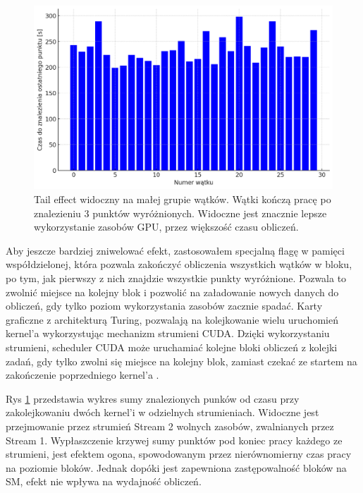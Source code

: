 \begin{figure}[H]
    \centering
    \includegraphics[width=1\textwidth]{img/tailing_effect_3_17.png}
    \caption{Tail effect widoczny na małej grupie wątków. Wątki kończą pracę po znalezieniu 3 punktów wyróżnionych.
        Widoczne jest znacznie lepsze wykorzystanie zasobów GPU, przez większość czasu obliczeń.}
    \label{fig:tail_effect_3}
\end{figure}

\par
Aby jeszcze bardziej zniwelować efekt, zastosowałem specjalną flagę w pamięci współdzielonej, która pozwala zakończyć obliczenia wszystkich wątków w bloku,
po tym, jak pierwszy z nich znajdzie wszystkie punkty wyróżnione. Pozwala to zwolnić miejsce na kolejny blok
i pozwolić na załadowanie nowych danych do obliczeń, gdy tylko poziom wykorzystania zasobów zacznie spadać.
Karty graficzne z architekturą Turing,
pozwalają na kolejkowanie wielu uruchomień kernel'a wykorzystując mechanizm strumieni CUDA.
Dzięki wykorzystaniu strumieni, scheduler CUDA
może uruchamiać kolejne bloki obliczeń z kolejki zadań, gdy tylko
zwolni się miejsce na kolejny blok, zamiast czekać ze startem na zakończenie poprzedniego kernel'a \cite{cuda}.
\par
Rys \ref{fig:tail_effect_3} przedstawia wykres sumy znalezionych punków od czasu przy zakolejkowaniu dwóch kernel'i w odzielnych strumieniach.
Widoczne jest przejmowanie przez strumień Stream 2 wolnych zasobów, zwalnianych przez Stream 1.
Wypłaszczenie krzywej sumy punktów pod koniec pracy każdego ze strumieni, jest
efektem ogona, spowodowanym przez nierównomierny czas pracy na poziomie bloków.
Jednak dopóki jest zapewniona zastępowalność bloków na SM, efekt nie wpływa na wydajność obliczeń.



